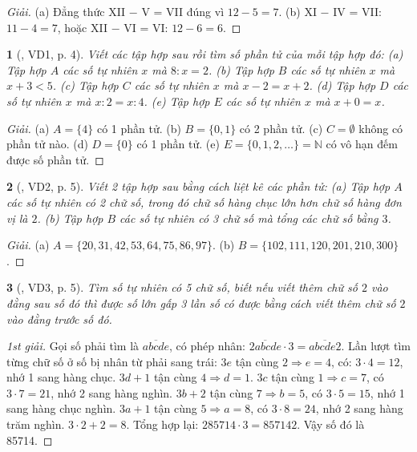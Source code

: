\documentclass{article}
\newtheorem{baitoan}{}
\begin{document}
\begin{proof}[Giải]
	(a) Đẳng thức XII $-$ V = VII đúng vì $12 - 5 = 7$. (b) XI $-$ IV = VII: $11 - 4 = 7$, hoặc XII $-$ VI = VI: $12 - 6 = 6$.
\end{proof}

\begin{baitoan}[\cite{Binh_Toan_6_tap_1}, VD1, p. 4]
	Viết các tập hợp sau rồi tìm số phần tử của mỗi tập hợp đó: (a) Tập hợp $A$ các số tự nhiên $x$ mà $8:x = 2$. (b) Tập hợp $B$ các số tự nhiên $x$ mà $x + 3 < 5$. (c) Tập hợp $C$ các số tự nhiên $x$ mà $x - 2 = x + 2$. (d) Tập hợp $D$ các số tự nhiên $x$ mà $x:2 = x:4$. (e) Tập hợp $E$ các số tự nhiên $x$ mà $x + 0 = x$.
\end{baitoan}

\begin{proof}[Giải]
	(a) $A = \{4\}$ có 1 phần tử. (b) $B = \{0,1\}$ có 2 phần tử. (c) $C = \emptyset$ không có phần tử nào. (d) $D = \{0\}$ có 1 phần tử. (e) $E = \{0,1,2,\ldots\} = \mathbb{N}$ có vô hạn đếm được số phần tử.
\end{proof}

\begin{baitoan}[\cite{Binh_Toan_6_tap_1}, VD2, p. 5]
	Viết 2 tập hợp sau bằng cách liệt kê các phần tử: (a) Tập hợp $A$ các số tự nhiên có 2 chữ số, trong đó chữ số hàng chục lớn hơn chữ số hàng đơn vị là $2$. (b) Tập hợp $B$ các số tự nhiên có 3 chữ số mà tổng các chữ số bằng $3$.
\end{baitoan}

\begin{proof}[Giải]
	(a) $A = \{20,31,42,53,64,75,86,97\}$. (b) $B = \{102,111,120,201,210,300\}$.
\end{proof}

\begin{baitoan}[\cite{Binh_Toan_6_tap_1}, VD3, p. 5]
	Tìm số tự nhiên có 5 chữ số, biết nếu viết thêm chữ số $2$ vào đằng sau số đó thì được số lớn gấp 3 lần số có được bằng cách viết thêm chữ số $2$ vào đằng trước số đó.
\end{baitoan}

\begin{proof}[1st giải]
	Gọi số phải tìm là $\overline{abcde}$, có phép nhân: $\overline{2abcde}\cdot3 = \overline{abcde2}$. Lần lượt tìm từng chữ số ở số bị nhân từ phải sang trái: $3e$ tận cùng $2\Rightarrow e = 4$, có: $3\cdot4 = 12$, nhớ 1 sang hàng chục. $3d + 1$ tận cùng $4\Rightarrow d = 1$. $3c$ tận cùng $1\Rightarrow c = 7$, có $3\cdot7 = 21$, nhớ 2 sang hàng nghìn. $3b + 2$ tận cùng $7\Rightarrow b = 5$, có $3\cdot5 = 15$, nhớ 1 sang hàng chục nghìn. $3a + 1$ tận cùng $5\Rightarrow a = 8$, có $3\cdot8 = 24$, nhớ 2 sang hàng trăm nghìn. $3\cdot2 + 2 = 8$. Tổng hợp lại: $285714\cdot3 = 857142$. Vậy số đó là 85714.
\end{proof}
\end{document}
